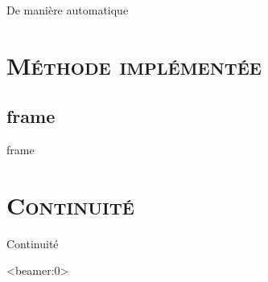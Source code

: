 \documentclass[xcolor=x11names,compress]{beamer}
\renewcommand{\(}{\begin{columns}} \renewcommand{\)}{\end{columns}}
\newcommand{\<}[1]{\begin{column}{#1}} \renewcommand{\>}{\end{column}}
\begin{document}
\begin{frame}{De manière automatique}
  \
\end{frame}


\section{\scshape Méthode implémentée}
\subsection{frame}
\begin{frame}{frame}

\end{frame}

\section{\scshape Continuité}
\begin{frame}{Continuité}

\end{frame}


\appendix

\begin{frame}<beamer:0>


\end{frame}
\end{document}
